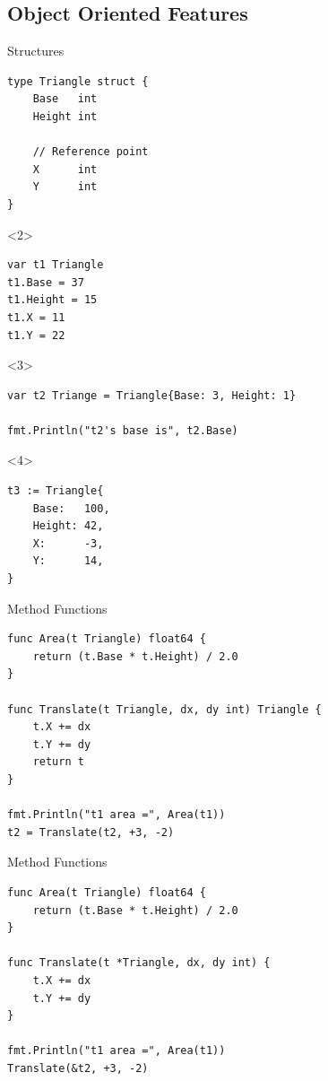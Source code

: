 \documentclass[pdf]{beamer}
\begin{document}
\subsection{Object Oriented Features}
\begin{frame}[fragile]{Structures}
\begin{lstlisting}
type Triangle struct {
    Base   int
    Height int

    // Reference point
    X      int
    Y      int
}
\end{lstlisting}
\begin{onlyenv}<2>
\begin{lstlisting}
var t1 Triangle
t1.Base = 37
t1.Height = 15
t1.X = 11
t1.Y = 22
\end{lstlisting}
\end{onlyenv}
\begin{onlyenv}<3>
\begin{lstlisting}
var t2 Triange = Triangle{Base: 3, Height: 1}

fmt.Println("t2's base is", t2.Base)
\end{lstlisting}
\end{onlyenv}
\begin{onlyenv}<4>
\begin{lstlisting}
t3 := Triangle{
    Base:   100,
    Height: 42,
    X:      -3,
    Y:      14,
}
\end{lstlisting}
\end{onlyenv}
\end{frame}

\begin{frame}[fragile]{Method Functions}
\begin{lstlisting}
func Area(t Triangle) float64 {
    return (t.Base * t.Height) / 2.0
}

func Translate(t Triangle, dx, dy int) Triangle {
    t.X += dx
    t.Y += dy
    return t
}

fmt.Println("t1 area =", Area(t1))
t2 = Translate(t2, +3, -2)
\end{lstlisting}
\end{frame}

\begin{frame}[fragile]{Method Functions}
\begin{lstlisting}
func Area(t Triangle) float64 {
    return (t.Base * t.Height) / 2.0
}

func Translate(t *Triangle, dx, dy int) {
    t.X += dx
    t.Y += dy
}

fmt.Println("t1 area =", Area(t1))
Translate(&t2, +3, -2)
\end{lstlisting}
\end{frame}
\end{document}

